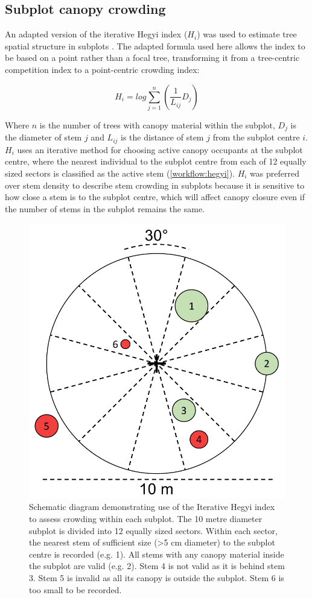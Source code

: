 \begin{refsection}
\subsection{Subplot canopy crowding}
\label{workflow:ssec:hegyi}

An adapted version of the iterative Hegyi index ($H_{i}$) was used to estimate tree spatial structure in subplots \citep{Hegyi1974}. The adapted formula used here allows the index to be based on a point rather than a focal tree, transforming it from a tree-centric competition index to a point-centric crowding index:

\begin{equation}
	H_{i} = log\sum_{j=1}^{n} (\frac{1}{L_{ij}} D_{j})
\end{equation}

Where $n$ is the number of trees with canopy material within the subplot, $D_{j}$ is the diameter of stem $j$ and $L_{ij}$ is the distance of stem $j$ from the subplot centre $i$. $H_{i}$ uses an iterative method for choosing active canopy occupants at the subplot centre, where the nearest individual to the subplot centre from each of 12 equally sized sectors is classified as the active stem (\autoref{workflow:hegyi}). $H_{i}$ was preferred over stem density to describe stem crowding in subplots because it is sensitive to how close a stem is to the subplot centre, which will affect canopy closure even if the number of stems in the subplot remains the same. 

\begin{figure}
	\includegraphics[width=0.6\linewidth]{img/hegyi}
	\caption[Schematic diagram illustrating the iterative Hegyi index]{Schematic diagram demonstrating use of the Iterative Hegyi index to assess crowding within each subplot. The 10 metre diameter subplot is divided into 12 equally sized sectors. Within each sector, the nearest stem of sufficient size (>5 cm diameter) to the subplot centre is recorded (e.g. 1). All stems with any canopy material inside the subplot are valid (e.g. 2). Stem 4 is not valid as it is behind stem 3. Stem 5 is invalid as all its canopy is outside the subplot. Stem 6 is too small to be recorded.}
	\label{workflow:hegyi}
\end{figure}

\newpage{}
\FloatBarrier{}
\begingroup
{}
\printbibliography[heading=subbibintoc]
\endgroup

\end{refsection}

